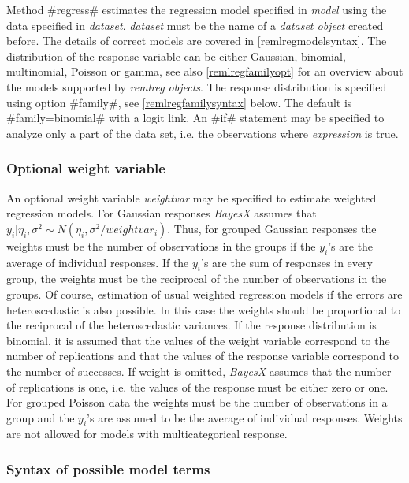 Method #regress# estimates the regression model specified in {\em
model} using the data specified in {\em dataset}. {\em dataset}
must be the name of a {\em dataset object} created before. The
details of correct models are covered in
\autoref{remlregmodelsyntax}. The distribution of the response
variable can be either Gaussian, binomial, multinomial, Poisson or
gamma, see also \autoref{remlregfamilyopt} for an overview about
the models supported by {\em remlreg objects}. The response
distribution is specified using option #family#, see
\autoref{remlregfamilysyntax} below. The default is
#family=binomial# with a logit link. An #if# statement may be
specified to analyze only a part of the data set, i.e. the
observations where {\em expression} is true.

\subsubsection{Optional weight variable }
\label{remlregweightspecification}

An optional weight variable {\em weightvar} may be specified to
estimate weighted regression models. For Gaussian responses {\em
BayesX} assumes that $y_i|\eta_i,\sigma^2 \sim
N(\eta_i,\sigma^2/weightvar_i)$. Thus, for grouped Gaussian
responses the weights must be the number of observations in the
groups if the $y_i$'s are the average of individual responses. If
the $y_i$'s are the sum of responses in every group, the weights
must be the reciprocal of the number of observations in the
groups. Of course, estimation of usual weighted regression models
if the errors are heteroscedastic is also possible. In this case
the weights should be proportional to the reciprocal of the
heteroscedastic variances. If the response distribution is
binomial, it is assumed that the values of the weight variable
correspond to the number of replications and that the values of
the response variable correspond to the number of successes. If
weight is omitted, {\em BayesX} assumes that the number of
replications is one, i.e. the values of the response must be
either zero or one. For grouped Poisson data the weights must be
the number of observations in a group and the $y_i$'s are assumed
to be the average of individual responses. Weights are not allowed
for models with multicategorical response.

\subsubsection{Syntax of possible model terms}
\label{remlregmodelsyntax}

